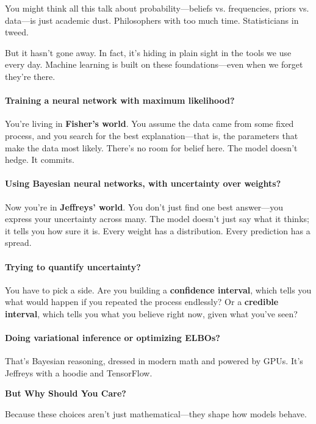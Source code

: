 You might think all this talk about probability—beliefs vs. frequencies, priors vs. data—is just academic dust. Philosophers with too much time. Statisticians in tweed.

But it hasn’t gone away. In fact, it’s hiding in plain sight in the tools we use every day.  
Machine learning is built on these foundations—even when we forget they’re there.

\paragraph{Training a neural network with maximum likelihood?}  
You’re living in \textbf{Fisher’s world}. You assume the data came from some fixed process, and you search for the best explanation—that is, the parameters that make the data most likely. There’s no room for belief here. The model doesn’t hedge. It commits.

\paragraph{Using Bayesian neural networks, with uncertainty over weights?}  
Now you’re in \textbf{Jeffreys’ world}. You don’t just find one best answer—you express your uncertainty across many. The model doesn’t just say what it thinks; it tells you how sure it is. Every weight has a distribution. Every prediction has a spread.

\paragraph{Trying to quantify uncertainty?}  
You have to pick a side. Are you building a \textbf{confidence interval}, which tells you what would happen if you repeated the process endlessly? Or a \textbf{credible interval}, which tells you what you believe right now, given what you’ve seen?

\paragraph{Doing variational inference or optimizing ELBOs?}  
That’s Bayesian reasoning, dressed in modern math and powered by GPUs. It’s Jeffreys with a hoodie and TensorFlow.

\vspace{0.5em}
\noindent
\textbf{But Why Should You Care?}

Because these choices aren’t just mathematical—they shape how models behave.

